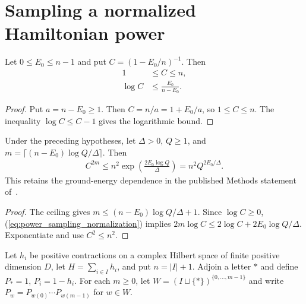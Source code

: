 \section{Sampling a normalized Hamiltonian power}

\begin{theorem}
    \label{thm:power_sampling_normalization}
    \leanok
    Let $0\le E_0\le n-1$ and put $C=(1-E_0/n)^{-1}$. Then
    \begin{align}
        1      & \le C\le n,           \\
        \log C & \le\frac{E_0}{n-E_0}.
        \label{eq:power_sampling_normalization}
    \end{align}
\end{theorem}
\begin{proof}\leanok
    Put $a=n-E_0\ge1$. Then $C=n/a=1+E_0/a$, so $1\le C\le n$.
    The inequality $\log C\le C-1$ gives the logarithmic bound.
\end{proof}

\begin{theorem}
    \label{thm:power_sampling_energy_exponent}
    \leanok
    Under the preceding hypotheses, let $\Delta>0$, $Q\ge1$, and
    $m=\lceil(n-E_0)\log Q/\Delta\rceil$. Then
    \begin{align}
        C^{2m}\le n^2\exp\left(\frac{2E_0\log Q}{\Delta}\right)
        =n^2Q^{2E_0/\Delta}.
        \label{eq:power_sampling_energy_exponent}
    \end{align}
    This retains the ground-energy dependence in the published Methods statement
    of~\cite[Proposition~1, p.~6]{Landau2015Published}.
\end{theorem}
\begin{proof}\leanok
    The ceiling gives $m\le(n-E_0)\log Q/\Delta+1$.
    Since $\log C\ge0$, (\ref{eq:power_sampling_normalization}) implies
    $2m\log C\le2\log C+2E_0\log Q/\Delta$.
    Exponentiate and use $C^2\le n^2$.
\end{proof}

Let $h_i$ be positive contractions on a complex Hilbert space of finite
positive dimension $D$, let $H=\sum_{i\in I}h_i$, and put $n=|I|+1$.
Adjoin a letter $\ast$ and define $P_\ast=1$, $P_i=1-h_i$.
For each $m\ge0$, let $W=(I\sqcup\{\ast\})^{\{0,\ldots,m-1\}}$
and write $P_w=P_{w(0)}\cdots P_{w(m-1)}$ for $w\in W$.

